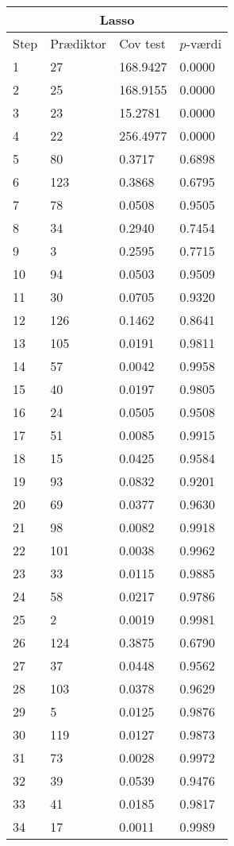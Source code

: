 \begin{table}[ht] 
\centering 
\begin{tabular}{llll}
\multicolumn{4}{c}{Lasso} \\
\toprule
Step & Prædiktor & Cov test & \(p\)-værdi \\
\midrule
1 & 27 &  168.9427 & 0.0000 \\
2 & 25 & 168.9155 & 0.0000 \\
3 & 23 &  15.2781 & 0.0000 \\
4 & 22 & 256.4977 & 0.0000 \\
5 & 80 & 0.3717 & 0.6898 \\
6 & 123 & 0.3868 & 0.6795 \\
7 & 78 & 0.0508 & 0.9505 \\
8 & 34 & 0.2940 & 0.7454 \\
9 & 3 & 0.2595 & 0.7715 \\
10 & 94 & 0.0503 & 0.9509 \\
11 & 30 & 0.0705 & 0.9320 \\
12 & 126 & 0.1462 & 0.8641 \\
13 & 105 & 0.0191 & 0.9811 \\
14 & 57 & 0.0042 & 0.9958 \\
15 & 40 & 0.0197 & 0.9805 \\
16 & 24 & 0.0505 & 0.9508 \\
17 & 51 & 0.0085 & 0.9915 \\
18 & 15 & 0.0425 & 0.9584 \\
19 & 93 & 0.0832 & 0.9201 \\
20 & 69 & 0.0377 & 0.9630 \\
21 & 98 & 0.0082 & 0.9918 \\
22 & 101 & 0.0038 & 0.9962 \\
23 & 33 & 0.0115 & 0.9885 \\
24 & 58 & 0.0217 & 0.9786 \\
25 & 2 & 0.0019 & 0.9981 \\
26 & 124 & 0.3875 & 0.6790 \\
27 & 37 & 0.0448 & 0.9562 \\
28 & 103 & 0.0378 & 0.9629 \\
29 & 5 & 0.0125 & 0.9876 \\
30 & 119 & 0.0127 & 0.9873 \\
31 & 73 & 0.0028 & 0.9972 \\
32 & 39 & 0.0539 & 0.9476 \\
33 & 41 & 0.0185 & 0.9817 \\
34 & 17 & 0.0011 &0.9989 \\

\end{tabular}
\end{table}
